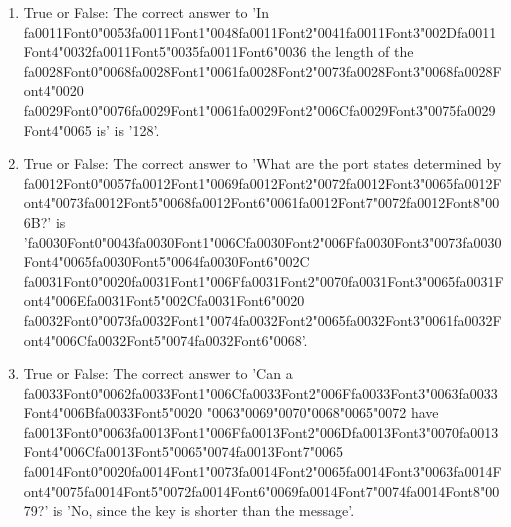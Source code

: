 \documentclass[12pt]{article}
\begin{document}
\begin{enumerate}[label=\arabic*.]
\item True or False: The correct answer to 'In {\csname fa0011Font0\endcsname\char"0053}{\csname fa0011Font1\endcsname\char"0048}{\csname fa0011Font2\endcsname\char"0041}{\csname fa0011Font3\endcsname\char"002D}{\csname fa0011Font4\endcsname\char"0032}{\csname fa0011Font5\endcsname\char"0035}{\csname fa0011Font6\endcsname\char"0036} the length of the {\csname fa0028Font0\endcsname\char"0068}{\csname fa0028Font1\endcsname\char"0061}{\csname fa0028Font2\endcsname\char"0073}{\csname fa0028Font3\endcsname\char"0068}{\csname fa0028Font4\endcsname\char"0020} {\csname fa0029Font0\endcsname\char"0076}{\csname fa0029Font1\endcsname\char"0061}{\csname fa0029Font2\endcsname\char"006C}{\csname fa0029Font3\endcsname\char"0075}{\csname fa0029Font4\endcsname\char"0065} is' is '128'.
\item True or False: The correct answer to 'What are the port states determined by {\csname fa0012Font0\endcsname\char"0057}{\csname fa0012Font1\endcsname\char"0069}{\csname fa0012Font2\endcsname\char"0072}{\csname fa0012Font3\endcsname\char"0065}{\csname fa0012Font4\endcsname\char"0073}{\csname fa0012Font5\endcsname\char"0068}{\csname fa0012Font6\endcsname\char"0061}{\csname fa0012Font7\endcsname\char"0072}{\csname fa0012Font8\endcsname\char"006B}?' is '{\csname fa0030Font0\endcsname\char"0043}{\csname fa0030Font1\endcsname\char"006C}{\csname fa0030Font2\endcsname\char"006F}{\csname fa0030Font3\endcsname\char"0073}{\csname fa0030Font4\endcsname\char"0065}{\csname fa0030Font5\endcsname\char"0064}{\csname fa0030Font6\endcsname\char"002C} {\csname fa0031Font0\endcsname\char"0020}{\csname fa0031Font1\endcsname\char"006F}{\csname fa0031Font2\endcsname\char"0070}{\csname fa0031Font3\endcsname\char"0065}{\csname fa0031Font4\endcsname\char"006E}{\csname fa0031Font5\endcsname\char"002C}{\csname fa0031Font6\endcsname\char"0020} {\csname fa0032Font0\endcsname\char"0073}{\csname fa0032Font1\endcsname\char"0074}{\csname fa0032Font2\endcsname\char"0065}{\csname fa0032Font3\endcsname\char"0061}{\csname fa0032Font4\endcsname\char"006C}{\csname fa0032Font5\endcsname\char"0074}{\csname fa0032Font6\endcsname\char"0068}'.
\item True or False: The correct answer to 'Can a {\csname fa0033Font0\endcsname\char"0062}{\csname fa0033Font1\endcsname\char"006C}{\csname fa0033Font2\endcsname\char"006F}{\csname fa0033Font3\endcsname\char"0063}{\csname fa0033Font4\endcsname\char"006B}{\csname fa0033Font5\endcsname\char"0020} {\char"0063}{\char"0069}{\char"0070}{\char"0068}{\char"0065}{\char"0072} have {\csname fa0013Font0\endcsname\char"0063}{\csname fa0013Font1\endcsname\char"006F}{\csname fa0013Font2\endcsname\char"006D}{\csname fa0013Font3\endcsname\char"0070}{\csname fa0013Font4\endcsname\char"006C}{\csname fa0013Font5\endcsname\char"0065}{\char"0074}{\csname fa0013Font7\endcsname\char"0065} {\csname fa0014Font0\endcsname\char"0020}{\csname fa0014Font1\endcsname\char"0073}{\csname fa0014Font2\endcsname\char"0065}{\csname fa0014Font3\endcsname\char"0063}{\csname fa0014Font4\endcsname\char"0075}{\csname fa0014Font5\endcsname\char"0072}{\csname fa0014Font6\endcsname\char"0069}{\csname fa0014Font7\endcsname\char"0074}{\csname fa0014Font8\endcsname\char"0079}?' is 'No, since the key is shorter than the message'.

\end{enumerate}
\end{document}
